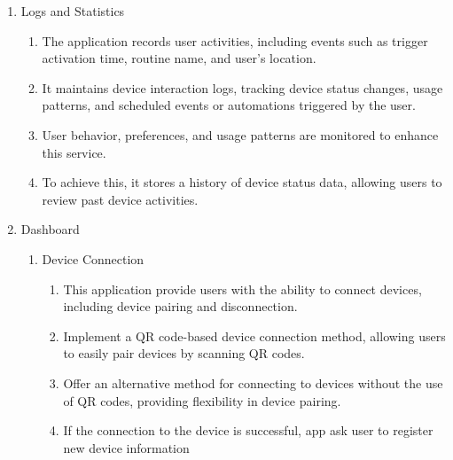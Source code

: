 \begin{enumerate}[label=\arabic*.]
      \item {\large{Logs and Statistics}}\\
            \begin{enumerate}[label*={\arabic*.},ref=\theenumi.\arabic*]
                  \setlength{\itemindent}{0.5cm}
                  \item The application records user activities, including events such as trigger activation time, routine name, and user's location. \\

                  \item It maintains device interaction logs, tracking device status changes, usage patterns, and scheduled events or automations triggered by the user. \\


                  \item User behavior, preferences, and usage patterns are monitored to enhance this service. \\

                  \item To achieve this, it stores a history of device status data, allowing users to review past device activities.\\
            \end{enumerate}


      \item {\large{Dashboard}}\\
            \begin{enumerate}[label*={\arabic*.}]
                  \item {\large{Device Connection}}\\
                        \begin{enumerate}[label*={\arabic*.},ref=\theenumi.\arabic*]
                              \setlength{\itemindent}{0.5cm}
                              \item This application provide users with the ability to connect devices, including device pairing and disconnection.\\
                              \item Implement a QR code-based device connection method, allowing users to easily pair devices by scanning QR codes.\\
                              \item Offer an alternative method for connecting to devices without the use of QR codes, providing flexibility in device pairing.\\
                              \item If the connection to the device is successful, app ask user to register new device information\\
                        \end{enumerate}


\end{enumerate}
\end{enumerate}
